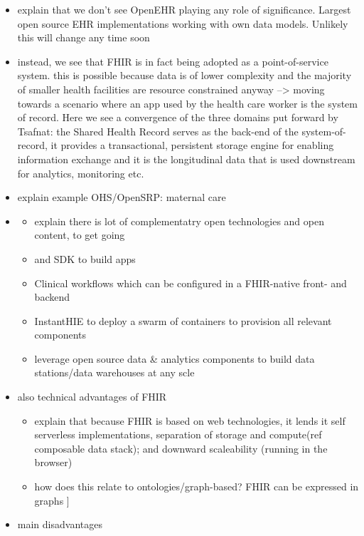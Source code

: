 \documentclass[
  authoryear]{elsarticle}
\providecommand{\tightlist}{%
  \setlength{\itemsep}{0pt}\setlength{\parskip}{0pt}}\usepackage{longtable,booktabs,array}
\begin{document}
\begin{itemize}
\tightlist
\item
  explain that we don't see OpenEHR playing any role of significance.
  Largest open source EHR implementations working with own data models.
  Unlikely this will change any time soon
  \citep{syzdykova2017opensource}
\item
  instead, we see that FHIR is in fact being adopted as a
  point-of-service system. this is possible because data is of lower
  complexity and the majority of smaller health facilities are resource
  constrained anyway --\textgreater{} moving towards a scenario where an
  app used by the health care worker is the system of record. Here we
  see a convergence of the three domains put forward by Tsafnat: the
  Shared Health Record serves as the back-end of the system-of-record,
  it provides a transactional, persistent storage engine for enabling
  information exchange and it is the longitudinal data that is used
  downstream for analytics, monitoring etc.
\item
  explain example OHS/OpenSRP: maternal care
\item
  \begin{itemize}
  \tightlist
  \item
    explain there is lot of complementatry open technologies and open
    content, to get going
  \item
    and SDK to build apps
  \item
    Clinical workflows which can be configured in a FHIR-native front-
    and backend
  \item
    InstantHIE to deploy a swarm of containers to provision all relevant
    components
  \item
    leverage open source data \& analytics components to build data
    stations/data warehouses at any scle
  \end{itemize}
\item
  also technical advantages of FHIR

  \begin{itemize}
  \tightlist
  \item
    explain that because FHIR is based on web technologies, it lends it
    self serverless implementations, separation of storage and
    compute(ref composable data stack); and downward scaleability
    (running in the browser)
  \item
    how does this relate to ontologies/graph-based? FHIR can be
    expressed in graphs \citep{gebreslassie2023fhir4fair}{]}
  \end{itemize}
\item
  main disadvantages


\end{itemize}
\end{document}
